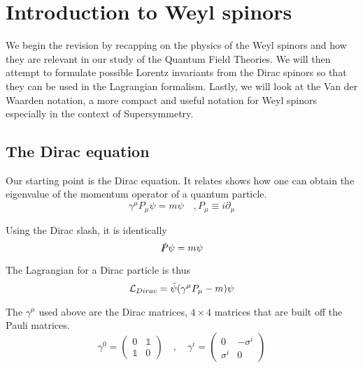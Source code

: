 \chapter{Introduction to Weyl spinors}
\label{ch:2}

We begin the revision by recapping on the physics of the Weyl spinors and how they are relevant in our study of the Quantum Field Theories. We will then attempt to formulate possible Lorentz invariants from the Dirac spinors so that they can be used in the Lagrangian formalism. Lastly, we will look at the Van der Waarden notation, a more compact and useful notation for Weyl spinors especially in the context of Supersymmetry.

\section{The Dirac equation}
\label{ch:1:dirac equation}
Our starting point is the Dirac equation. It relates shows how one can obtain the eigenvalue of the momentum operator of a quantum particle.
\begin{equation}
    \gamma^\mu P_\mu \psi = m \psi \quad , P_\mu \equiv i \partial_\mu
    \label{eqn:2:dirac equation}
\end{equation}

Using the Dirac slash, it is identically
\begin{equation}
    \slashed P \psi = m \psi
    \label{eqn:2:slashed dirac equation}
\end{equation}

The Lagrangian for a Dirac particle is thus
\begin{equation}
    \mathcal{L}_{Dirac} = \Bar{\psi} (\gamma^\mu P_\mu - m) \psi
    \label{eqn:2:dirac lagrangian}
\end{equation}

The $\gamma^\mu$ used above are the Dirac matrices, $4\times4$ matrices that are built off the Pauli matrices.
\begin{equation}
    \gamma^0 =
    \begin{pmatrix}
        0 & \mathbb{1}\\
        \mathbb{1} & 0
    \end{pmatrix}
    \quad , \quad
    \gamma^i =
    \begin{pmatrix}
        0 & - \sigma^i\\
        \sigma^i & 0
    \end{pmatrix}
    \label{eqn:2:dirac matrices}
\end{equation}

